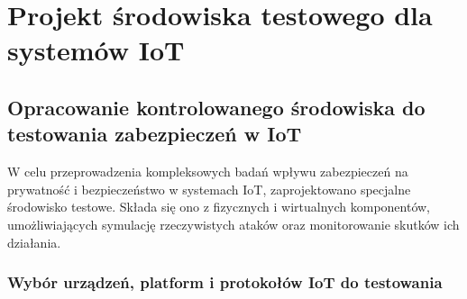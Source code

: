 \chapter{Projekt środowiska testowego dla systemów IoT}
\label{chap:rozdzial4}
\section{Opracowanie kontrolowanego środowiska do testowania zabezpieczeń w IoT}
W celu przeprowadzenia kompleksowych badań wpływu zabezpieczeń na prywatność i bezpieczeństwo w systemach IoT, zaprojektowano specjalne środowisko testowe. Składa się ono z fizycznych i wirtualnych komponentów, umożliwiających symulację rzeczywistych ataków oraz monitorowanie skutków ich działania.
\subsection{Wybór urządzeń, platform i protokołów IoT do testowania}
